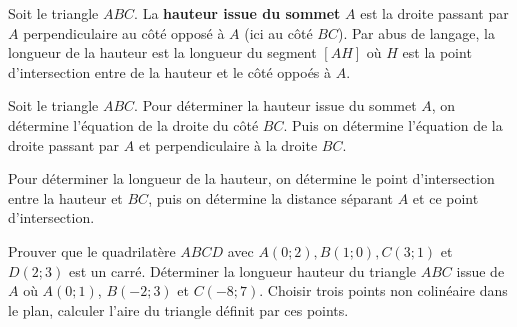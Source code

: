 \documentclass[a4paper,12pt]{report}
\begin{document}
\begin{defi}
    Soit le triangle $ABC$. La {\bfseries hauteur issue du sommet} $A$ est la droite passant par $A$ perpendiculaire au côté opposé à $A$ (ici au côté $BC$). Par abus de langage, la longueur de la hauteur est la longueur du segment $[AH]$ où $H$ est la point d'intersection entre de la hauteur et le côté oppoés à $A$. 
\end{defi}

\begin{rem}
Soit le triangle $ABC$. Pour déterminer la hauteur issue du sommet $A$, on détermine l'équation de la droite du côté $BC$. Puis on détermine l'équation de la droite passant par $A$ et perpendiculaire à la droite $BC$.

Pour déterminer la longueur de la hauteur, on détermine le point d'intersection entre la hauteur et $BC$, puis on détermine la distance séparant $A$ et ce point d'intersection. 
\end{rem}
   \begin{boiteExT}
    \vspace{15cm}
       
   \end{boiteExT}
\medskip
   \begin{exo}
       \begin{tasks}
        \task Prouver que le quadrilatère $ABCD$ avec $A(0;2), B(1;0), C(3;1)$ et $D(2;3)$ est un carré.
        \task Déterminer la longueur hauteur du triangle $ABC$ issue de $A$ où $A(0;1)$, $B(-2;3)$ et $C(-8;7)$.
        \task Choisir trois points non colinéaire dans le plan, calculer l'aire du triangle définit par ces points. 
       \end{tasks}
   \end{exo}
\end{document}
